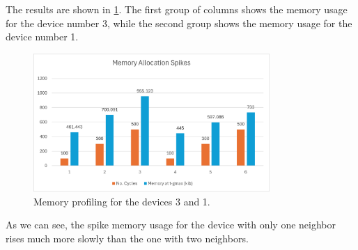 The results are shown in \cref{fig:memory_profiling}. The first group of columns shows the memory usage for the device number 3, while the second group shows the memory usage for the device number 1.

\begin{figure}[ht!]
    \centering
    \includegraphics[width=0.8\textwidth]{figures/mem-spikes.png}
    \caption{Memory profiling for the devices 3 and 1.}
    \label{fig:memory_profiling}
\end{figure}

As we can see, the spike memory usage for the device with only one neighbor rises much more slowly than the one with two neighbors.